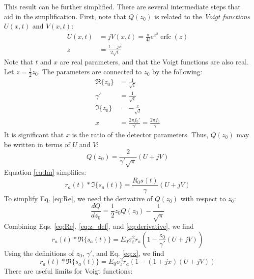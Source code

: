 \documentclass[amsmath,amssymb,aps,prd,10pt,twocolumn,showkeys]{revtex4}
\DeclareMathOperator\erfc{erfc}
\begin{document}
\begin{itemize}
\begin{equation}
\end{equation}
This result can be further simplified.  There are several intermediate steps that aid in the simplification.  First, note that $Q(z_0)$ is related to the \textit{Voigt functions} $U(x,t)$ and $V(x,t)$:
\begin{align}
U(x,t) &= j V(x,t) = \frac{\pi}{4 t} e^{z^2} \erfc(z) \\
z &= \frac{1-jx}{2\sqrt{t}} \label{eq:z_def}
\end{align}
Note that $t$ and $x$ are real parameters, and that the Voigt functions are also real.  Let $z = \frac{1}{2}z_0$. The parameters are connected to $z_0$ by the following:
\begin{align}
\Re \lbrace z_0 \rbrace &= \frac{1}{\sqrt{t}} \\
\gamma ' &= \frac{1}{\sqrt{t}} \\
\Im \lbrace z_0 \rbrace &= -\frac{x}{\sqrt{t}} \\
x &= \frac{2\pi f_0'}{\gamma'} = \frac{2\pi f_0}{\gamma} \label{eq:x}
\end{align}
It is significant that $x$ is the ratio of the detector parameters.  Thus, $Q(z_0)$ may be written in terms of $U$ and $V$:
\begin{equation}
Q(z_0) = \frac{2}{\gamma'\sqrt{\pi}}\left(U + j V\right)
\end{equation}
Equation \ref{eq:Im} simplifies:
\begin{equation}
\boxed{r_a(t) * \Im\lbrace s_a(t)\rbrace = \frac{R_0 s(t)}{\gamma} \left(U + j V \right)} \label{eq:int_1}
\end{equation}
To simplify Eq. \ref{eq:Re}, we need the derivative of $Q(z_0)$ with respect to $z_0$:
\begin{equation}
\frac{dQ}{dz_0} = \frac{1}{2}z_0 Q(z_0) - \frac{1}{\sqrt{\pi}} \label{eq:derivative}
\end{equation}
Combining Eqs. \ref{eq:Re}, \ref{eq:z_def}, and \ref{eq:derivative}, we find
\begin{equation}
r_a(t) * \Re\lbrace s_a(t)\rbrace = E_0 \sigma_t^2 r_a \left(1 - \frac{z_0}{\gamma'}\left(U + j V \right)\right)
\end{equation}
Using the definitions of $z_0$, $\gamma'$, and Eq. \ref{eq:x}, we find
\begin{equation}
\boxed{r_a(t) * \Re\lbrace s_a(t)\rbrace = E_0 \sigma_t^2 r_a \left(1 - \left(1 + j x \right)\left(U + j V \right)\right)} \label{eq:int_2}
\end{equation}
There are useful limits for Voigt functions:

\end{itemize}
\end{document}
